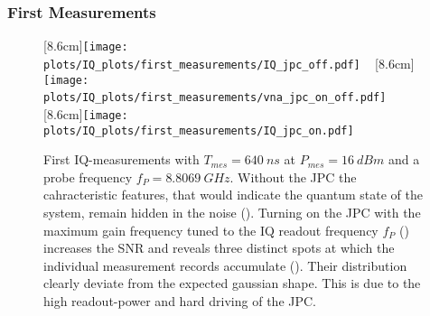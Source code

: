 \subsubsection{First Measurements}





\begin{figure}
\centering
{}
[8.6cm]{\texttt{[image: plots/IQ\_plots/first\_measurements/IQ\_jpc\_off.pdf]}}
~
[8.6cm]{\texttt{[image: plots/IQ\_plots/first\_measurements/vna\_jpc\_on\_off.pdf]}}
~
[8.6cm]{\texttt{[image: plots/IQ\_plots/first\_measurements/IQ\_jpc\_on.pdf]}}
\caption{
First IQ-measurements with $T_{mes} = \SI{640}{ns}$ at $P_{mes} = \SI{16}{dBm}$ and a probe frequency $f_{P} = \SI{8.8069}{GHz}$. Without the JPC the cahracteristic features, that would indicate the quantum state of the system, remain hidden in the noise (). Turning on the JPC with the maximum gain frequency tuned to the IQ readout frequency $f_{P}$ () increases the SNR and reveals three distinct spots at which the individual measurement records accumulate (). Their distribution clearly deviate from the expected gaussian shape. This is due to the high readout-power and hard driving of the JPC.}
\label{fig:IQ:first_measurements:main}
\end{figure}

